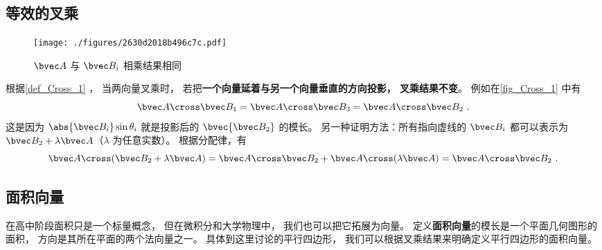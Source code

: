 
\subsection{等效的叉乘}\label{sub_Cross_1}
\begin{figure}[ht]
\centering
\texttt{[image: ./figures/2630d2018b496c7c.pdf]}
\caption{$\bvec A$ 与 $\bvec B_i$ 相乘结果相同} \label{fig_Cross_1}
\end{figure}

根据\autoref{def_Cross_1} ， 当两向量叉乘时， 若把\textbf{一个向量延着与另一个向量垂直的方向投影， 叉乘结果不变}。 例如在\autoref{fig_Cross_1} 中有
\begin{equation}
\bvec A\cross\bvec B_1 = \bvec A \cross \bvec B_3 = \bvec A\cross \bvec B_2~.
\end{equation}
这是因为 $\abs{\bvec B_i}\sin\theta_i$ 就是投影后的 $\bvec{\bvec B_2}$ 的模长。 另一种证明方法：所有指向虚线的 $\bvec B_i$ 都可以表示为 $\bvec B_2 + \lambda \bvec A$（$\lambda$ 为任意实数）。 根据分配律，有
\begin{equation}
\bvec A \cross (\bvec B_2 + \lambda \bvec A) = \bvec A \cross \bvec B_2 + \bvec A \cross (\lambda \bvec A) = \bvec A \cross \bvec B_2~.
\end{equation}

\subsection{面积向量}
在高中阶段面积只是一个标量概念， 但在微积分和大学物理中， 我们也可以把它拓展为向量。 定义\textbf{面积向量}的模长是一个平面几何图形的面积， 方向是其所在平面的两个法向量之一。 具体到这里讨论的平行四边形， 我们可以根据叉乘结果来明确定义平行四边形的面积向量。

